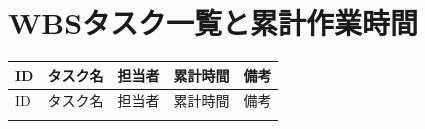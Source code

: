 
\section{WBSタスク一覧と累計作業時間}

\begingroup
\small
\begin{longtable}{p{0.9cm}p{7cm}p{2.5cm}p{2cm}p{2cm}}
\toprule
ID & タスク名 & 担当者 & 累計時間 & 備考 \\
\midrule
\endfirsthead

\toprule
ID & タスク名 & 担当者 & 累計時間 & 備考 \\
\midrule
\endhead

\bottomrule
\endfoot


\end{longtable}
